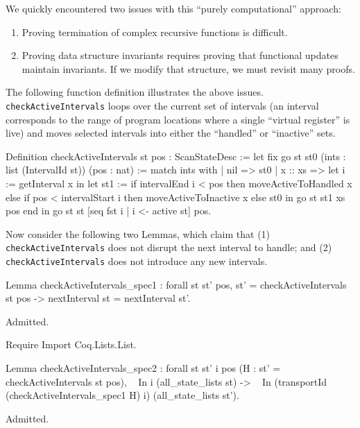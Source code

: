 \documentclass{llncs}
\begin{document}
We quickly encountered two issues with this ``purely computational'' approach:
\begin{enumerate}
\item Proving termination of complex recursive functions is difficult.
\item Proving data structure invariants requires proving that functional
  updates maintain invariants. If we modify that structure, we must revisit
  many proofs.
\end{enumerate}
The following function definition illustrates the above
issues. \texttt{checkActiveIntervals} loops over the current set of
intervals (an interval corresponds to the range of program locations
where a single ``virtual register'' is live) and moves selected
intervals into either the ``handled'' or ``inactive'' sets.

\begin{coq_example*}
Definition checkActiveIntervals st pos : ScanStateDesc :=
  let fix go st st0 (ints : list (IntervalId st)) (pos : nat) :=
    match ints with
    | nil => st0
    | x :: xs =>
        let i := getInterval x in
        let st1 := if intervalEnd i < pos
                   then moveActiveToHandled x
                   else if pos < intervalStart i
                        then moveActiveToInactive x
                        else st0 in
        go st st1 xs pos
    end in
  go st st [seq fst i | i <- active st] pos.
\end{coq_example*}

Now consider the following two Lemmas, which claim that (1)
\texttt{checkActiveIntervals} does not disrupt the next interval to handle;
and (2) \texttt{checkActiveIntervals} does not introduce any new intervals.

\begin{coq_example*}
Lemma checkActiveIntervals_spec1 : forall st st' pos,
  st' = checkActiveIntervals st pos
    -> nextInterval st = nextInterval st'.
\end{coq_example*}
\begin{coq_eval}
Admitted.

Require Import Coq.Lists.List.
\end{coq_eval}

\begin{coq_example*}
Lemma checkActiveIntervals_spec2 : forall st st' i pos
  (H : st' = checkActiveIntervals st pos),
  ~ In i (all_state_lists st)
    -> ~ In (transportId (checkActiveIntervals_spec1 H) i)
            (all_state_lists st').
\end{coq_example*}
\begin{coq_eval}
Admitted.
\end{coq_eval}
\end{document}
